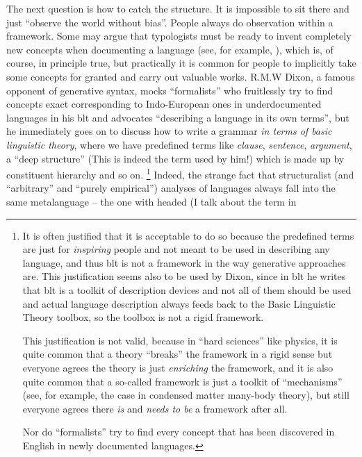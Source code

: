 \documentclass[../main.tex]{subfiles}
\begin{document}
The next question is how to catch the structure. It is impossible to sit there and just ``observe the world without bias''. People always do observation within a 
framework. Some may argue that typologists must be ready to invent completely new concepts when documenting 
a language (see, for example, \citet{haspelmath2008framework}), which is, of course, in principle true, 
but practically it is common for people to implicitly take some concepts for granted and carry out 
valuable works. R.M.W Dixon, a famous opponent of generative syntax, mocks ``formalists'' who fruitlessly try 
to find concepts exact corresponding to Indo-European ones in underdocumented languages in his 
\ac{blt} \citep{dixon2009basic} and advocates ``describing a language in its own terms'',
but he immediately goes on to discuss how to write a grammar \emph{in terms of basic linguistic theory},
where we have predefined terms like \emph{clause}, \emph{sentence}, \emph{argument}, a ``deep structure''
(This is indeed the term used by him!) which is made up by constituent hierarchy and so on.%
\footnote{
    It is often justified that it is acceptable to do so because the predefined terms are just for \emph{inspiring} 
    people and not meant to be used in describing any language, and thus \ac{blt} is not a framework in the way generative approaches are. This justification seems also to be used by Dixon, since in \ac{blt} he writes 
    that \ac{blt} is a toolkit of description devices and not all of them should be used and 
    actual language description always feeds back to the Basic Linguistic Theory toolbox, 
    so the toolbox is not a rigid framework.
    
    This justification is not valid, because in 
    ``hard sciences'' like physics, it is quite common that a theory ``breaks'' the framework in a rigid sense 
    but everyone agrees the theory is just \emph{enriching} the framework, and it is also quite common that 
    a so-called framework is just a toolkit of ``mechanisms'' (see, for example, the case in condensed matter 
    many-body theory), but still everyone agrees there \emph{is} and 
    \emph{needs to be} a framework after all. 
    
    Nor do ``formalists'' try to find every concept that has been discovered in English in newly documented 
    languages. %
}
Indeed, the strange fact that structuralist (and ``arbitrary'' and ``purely empirical'') analyses of 
languages always fall into the same metalanguage -- the one with headed (I talk about the term in 
\end{document}

